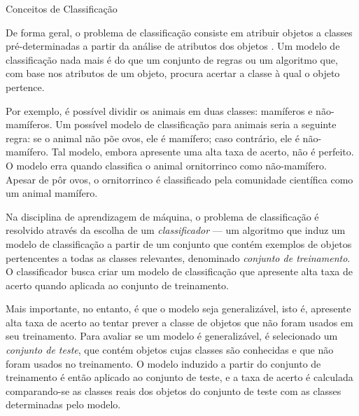 \begin{section}{Conceitos de Classificação} \label{cap:clas1}
	
	De forma geral, o problema de classificação consiste em atribuir objetos a classes pré-determinadas a partir da análise de atributos dos objetos \cite{Tan2005}. Um modelo de classificação nada mais é do que um conjunto de regras ou um algoritmo que, com base nos atributos de um objeto, procura acertar a classe à qual o objeto pertence. 

	Por exemplo, é possível dividir os animais em duas classes: mamíferos e não-mamíferos. Um possível modelo de classificação para animais seria a seguinte regra: se o animal não põe ovos, ele é mamífero; caso contrário, ele é não-mamífero. Tal modelo, embora apresente uma alta taxa de acerto, não é perfeito. O modelo erra quando classifica o animal ornitorrinco como não-mamífero. Apesar de pôr ovos, o ornitorrinco é classificado pela comunidade científica como um animal mamífero.
	
	
	
	Na disciplina de aprendizagem de máquina, o problema de classificação é resolvido através da escolha de um \emph{classificador} --- um algoritmo que induz um modelo de classificação a partir de um conjunto que contém exemplos de objetos pertencentes a todas as classes relevantes, denominado \emph{conjunto de treinamento}. O classificador busca criar um modelo de classificação que apresente alta taxa de acerto quando aplicada ao conjunto de treinamento. 
	
	Mais importante, no entanto, é que o modelo seja generalizável, isto é, apresente alta taxa de acerto ao tentar prever a classe de objetos que não foram usados em seu treinamento. Para avaliar se um modelo é generalizável, é selecionado um \emph{conjunto de teste}, que contém objetos cujas classes são conhecidas e que não foram usados no treinamento. O modelo induzido a partir do conjunto de treinamento é então aplicado ao conjunto de teste, e a taxa de acerto é calculada comparando-se as classes reais dos objetos do conjunto de teste com as classes determinadas pelo modelo.
	
	
\end{section}	
	
